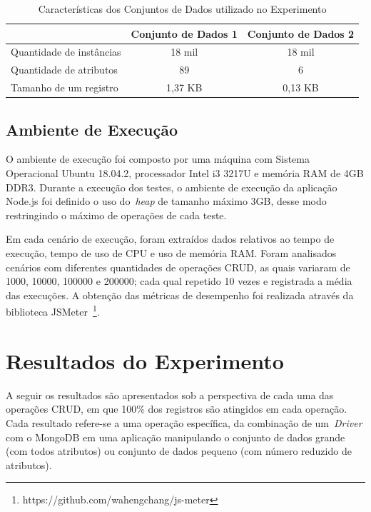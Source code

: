 \documentclass{svproc}
\begin{document}
\begin{table}[ht]
\centering
\caption{Características dos Conjuntos de Dados utilizado no Experimento}
\label{tab:conjunto-dados}
\begin{tabular}{c|c|c|}
\cline{2-3}
                         & \textbf{Conjunto de Dados 1} & \textbf{Conjunto de Dados 2} \\ \hline
\multicolumn{1}{|l|}{Quantidade de instâncias} & 18 mil   		 			& 18 mil            \\ \hline
\multicolumn{1}{|l|}{Quantidade de atributos}  & 89        		 			& 6                  \\ \hline
\multicolumn{1}{|l|}{Tamanho de um registro}   & 1,37 KB        				& 0,13 KB                    \\ \hline
\end{tabular}
\end{table}

\subsection{Ambiente de Execução}

O ambiente de execução foi composto por uma máquina com Sistema Operacional Ubuntu 18.04.2, processador Intel i3 3217U e memória RAM de 4GB DDR3. 
Durante a execução dos testes, o ambiente de execução da aplicação Node.js foi definido o uso do~\emph{heap} de tamanho máximo 3GB, desse modo restringindo o máximo de operações de cada teste.

Em cada cenário de execução, foram extraídos dados relativos ao tempo de execução, tempo de uso de CPU e uso de memória RAM. 
Foram analisados cenários com diferentes quantidades de operações CRUD, as quais variaram de 1000, 10000, 100000 e 200000; cada qual repetido 10 vezes e registrada a média das execuções. A obtenção das métricas de desempenho foi realizada através da biblioteca JSMeter~\footnote{https://github.com/wahengchang/js-meter}. 

\section{Resultados do Experimento}
\label{section:resultados}

A seguir os resultados são apresentados sob a perspectiva de cada uma das operações CRUD, em que 100\% dos registros são atingidos em cada operação. 
Cada resultado refere-se a uma operação específica, da combinação de um~\emph{Driver} com o MongoDB em uma aplicação manipulando o conjunto de dados grande (com todos atributos) ou conjunto de dados pequeno (com número reduzido de atributos).
\end{document}
